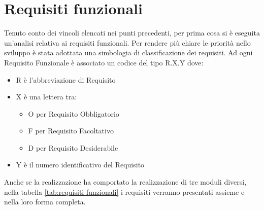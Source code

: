 \section{Requisiti funzionali}
Tenuto conto dei vincoli elencati nei punti precedenti, per prima cosa si è eseguita un'analisi relativa ai requisiti funzionali.
Per rendere più chiare le priorità nello sviluppo è stata adottata una simbologia di
classificazione dei requisiti.
Ad ogni Requisito Funzionale è associato un codice del tipo R.X.Y dove:
\begin{itemize}
\item R è l’abbreviazione di Requisito
\item X è una lettera tra:
\begin{itemize}
	\item O per Requisito Obbligatorio
	\item F per Requisito Facoltativo
	\item D per Requisito Desiderabile
\end{itemize}
\item Y è il numero identificativo del Requisito
\end{itemize}
Anche se la realizzazione ha comportato la realizzazione di tre moduli diversi, nella tabella \ref{tab:requisiti-funzionali} i requisiti verranno presentati assieme e nella loro forma completa.
\begingroup
\renewcommand\arraystretch{2}
